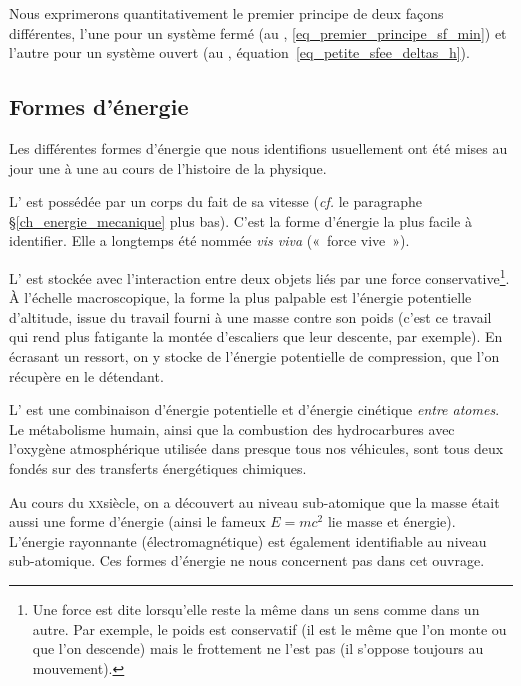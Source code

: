 		Nous exprimerons quantitativement le premier principe de deux façons différentes, l’une pour un système fermé (au \coursdeuxshort, \cref{eq_premier_principe_sf_min}) et l’autre pour un système ouvert (au \courstroisshort, équation~\ref{eq_petite_sfee_deltas_h}).
	
	
	\subsection{Formes d’énergie}
	
		Les différentes formes d’énergie que nous identifions usuellement ont été mises au jour une à une au cours de l’histoire de la physique.
		
		L’ est possédée par un corps du fait de sa vitesse (\textit{cf.} le paragraphe \S\ref{ch_energie_mecanique} plus bas). C’est la forme d’énergie la plus facile à identifier. Elle a longtemps été nommée \textit{vis viva} («~force vive~»).
		
		L’ est stockée avec l’interaction entre deux objets liés par une force conservative\footnote{Une force est dite  lorsqu’elle reste la même dans un sens comme dans un autre. Par exemple, le poids est conservatif (il est le même que l’on monte ou que l’on descende) mais le frottement ne l’est pas (il s’oppose toujours au mouvement).}. À l’échelle macroscopique, la forme la plus palpable est l’énergie potentielle d’altitude, issue du travail fourni à une masse contre son poids (c’est ce travail qui rend plus fatigante la montée d’escaliers que leur descente, par exemple). En écrasant un ressort, on y stocke de l’énergie potentielle de compression, que l’on récupère en le détendant.

		L’ est une combinaison d’énergie potentielle et d’énergie cinétique \emph{entre atomes}. Le métabolisme humain, ainsi que la combustion des hydrocarbures avec l’oxygène atmosphérique utilisée dans presque tous nos véhicules, sont tous deux fondés sur des transferts énergétiques chimiques.
		
		Au cours du \textsc{xx}\ieme siècle, on a découvert au niveau sub-atomique que la masse était aussi une forme d’énergie (ainsi le fameux $E = m c^2$ lie masse et énergie). L’énergie rayonnante (électromagnétique) est également identifiable au niveau sub-atomique. Ces formes d’énergie ne nous concernent pas dans cet ouvrage.

